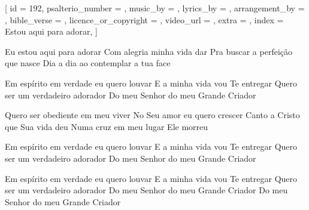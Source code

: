 
[
    id                     = {192},
    psalterio_number       = {},
    music_by               = {},
    lyrics_by              = {},
    arrangement_by         = {},
    bible_verse            = {},
    licence_or_copyright   = {},
    video_url              = {},
    extra                  = {},
    index                  = {Estou aqui para adorar},
]


\beginverse
Eu estou aqui para adorar
Com alegria minha vida dar
Pra buscar a perfeição que nasce
Dia a dia ao contemplar a tua face
\endverse

\beginchorus
Em espírito em verdade eu quero louvar
E a minha vida vou Te entregar
Quero ser um verdadeiro adorador
Do meu Senhor do meu Grande Criador
\endchorus

\beginverse
Quero ser obediente em meu viver
No Seu amor eu quero crescer
Canto a Cristo que Sua vida deu
Numa cruz em meu lugar Ele morreu
\endverse

\beginchorus
Em espírito em verdade eu quero louvar
E a minha vida vou Te entregar
Quero ser um verdadeiro adorador
Do meu Senhor do meu Grande Criador
\endchorus


\beginchorus
Em espírito em verdade eu quero louvar
E a minha vida vou Te entregar
Quero ser um verdadeiro adorador
Do meu Senhor do meu Grande Criador
Do meu Senhor do meu Grande Criador
\endchorus

\endsong
